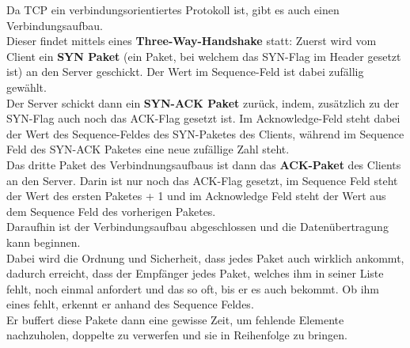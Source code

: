 \documentclass[12pt,a4paper]{report}
\begin{document}
\begin{onehalfspace}
Da TCP ein verbindungsorientiertes Protokoll ist, gibt es auch einen Verbindungsaufbau.\\
Dieser findet mittels eines \textbf{Three-Way-Handshake} statt: Zuerst wird vom Client ein \textbf{SYN Paket} (ein Paket, bei welchem das SYN-Flag im Header gesetzt ist) an den Server geschickt. Der Wert im Sequence-Feld ist dabei zufällig gewählt.\\
Der Server schickt dann ein \textbf{SYN-ACK Paket} zurück, indem, zusätzlich zu der SYN-Flag auch noch das ACK-Flag gesetzt ist. Im Acknowledge-Feld steht dabei der Wert des Sequence-Feldes des SYN-Paketes des Clients, während im Sequence Feld des SYN-ACK Paketes eine neue zufällige Zahl steht.\\
Das dritte Paket des Verbindnungsaufbaus ist dann das \textbf{ACK-Paket} des Clients an den Server. Darin ist nur noch das ACK-Flag gesetzt, im Sequence Feld steht der Wert des ersten Paketes + 1 und im Acknowledge Feld steht der Wert aus dem Sequence Feld des vorherigen Paketes.\\

Daraufhin ist der Verbindungsaufbau abgeschlossen und die Datenübertragung kann beginnen.\\
Dabei wird die Ordnung und Sicherheit, dass jedes Paket auch wirklich ankommt, dadurch erreicht, dass der Empfänger jedes Paket, welches ihm in seiner Liste fehlt, noch einmal anfordert und das so oft, bis er es auch bekommt. Ob ihm eines fehlt, erkennt er anhand des Sequence Feldes.\\
Er buffert diese Pakete dann eine gewisse Zeit, um fehlende Elemente nachzuholen, doppelte zu verwerfen und sie in Reihenfolge zu bringen.\\


\end{onehalfspace}
\end{document}

